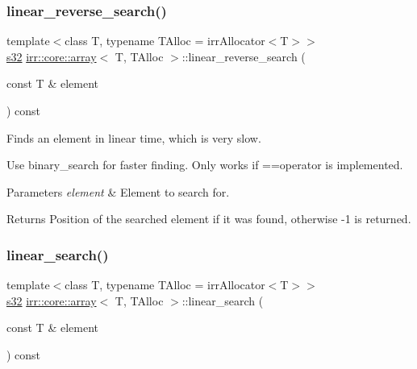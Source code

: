 \subsubsection{\texorpdfstring{linear\+\_\+reverse\+\_\+search()}{linear\_reverse\_search()}}
{\footnotesize\ttfamily template$<$class T, typename T\+Alloc = irr\+Allocator$<$\+T$>$$>$ \\
\hyperlink{namespaceirr_ac66849b7a6ed16e30ebede579f9b47c6}{s32} \hyperlink{classirr_1_1core_1_1array}{irr\+::core\+::array}$<$ T, T\+Alloc $>$\+::linear\+\_\+reverse\+\_\+search (\begin{DoxyParamCaption}\item[{const T \&}]{element }\end{DoxyParamCaption}) const\hspace{0.3cm}{\ttfamily [inline]}}



Finds an element in linear time, which is very slow. 

Use binary\+\_\+search for faster finding. Only works if ==operator is implemented. 
\begin{DoxyParams}{Parameters}
{\em element} & Element to search for. \\
\hline
\end{DoxyParams}
\begin{DoxyReturn}{Returns}
Position of the searched element if it was found, otherwise -\/1 is returned. 
\end{DoxyReturn}
\mbox{\label{classirr_1_1core_1_1array_a4b5002b36bb913a3680f2412ab2ee045}} 
\subsubsection{\texorpdfstring{linear\+\_\+search()}{linear\_search()}}
{\footnotesize\ttfamily template$<$class T, typename T\+Alloc = irr\+Allocator$<$\+T$>$$>$ \\
\hyperlink{namespaceirr_ac66849b7a6ed16e30ebede579f9b47c6}{s32} \hyperlink{classirr_1_1core_1_1array}{irr\+::core\+::array}$<$ T, T\+Alloc $>$\+::linear\+\_\+search (\begin{DoxyParamCaption}\item[{const T \&}]{element }\end{DoxyParamCaption}) const\hspace{0.3cm}{\ttfamily [inline]}}




